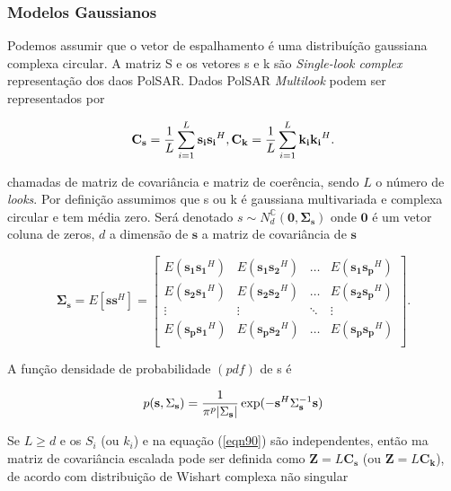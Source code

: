 \documentclass[12pt,a4paper]{article}
\begin{document}
\subsubsection{Modelos Gaussianos}


Podemos assumir que o vetor de espalhamento é uma distribuíção gaussiana complexa circular. A matriz {\boldmath S} e os vetores {\boldmath s} e {\boldmath k} são {\it Single-look complex} representação dos daos PolSAR. Dados PolSAR {\it Multilook} podem ser representados por
 
\begin{equation}\label{eqn90}
	\mathbf{C_{\mathbf s}}=\frac{1}{L}\sum_{i=1}^{L} \mathbf{s_i s_i}^H ,
	\mathbf{C_{\mathbf k}}=\frac{1}{L}\sum_{i=1}^{L} \mathbf{k_i k_i}^H . \\
\end{equation}

chamadas de matriz de covariância e matriz de coerência, sendo $L$ o número de {\it looks}. Por definição assumimos que {\boldmath s} ou {\boldmath k} é gaussiana multivariada e complexa circular e tem média zero. Será denotado $s\sim N_d^\mathbb{C}(\mathbf{0, \Sigma_{s}})$ onde $\mathbf{0}$ é um vetor coluna de zeros, $d$ a dimensão de $\mathbf{s}$ a matriz de covariância de $\mathbf{s}$  

\begin{equation}\label{eqn91}
	\mathbf{\Sigma_{\mathbf{s}}} = E[\mathbf{s}\mathbf{s}^H] =\left[
\begin{array}{cccc}
	E(\mathbf{s_1s_1}^H)  & E(\mathbf{s_1s_2}^H) &\hdots & E(\mathbf {s_1s_p}^H) \\
	E(\mathbf{s_2 s_1}^H)  & E(\mathbf{ s_2 s_2}^H) &\hdots &E(\mathbf{s_2 s_p}^H)\\
        \vdots&\vdots &\ddots &\vdots\\
	E(\mathbf{s_p s_1}^H)  & E(\mathbf{s_ps_2}^H) &\hdots &E(\mathbf{s_p s_p}^H)\\
\end{array}
\right].
\end{equation}

A função densidade de probabilidade $(pdf)$ de {\boldmath s} é 

\begin{equation}\label{eqn92}
	p(\mathbf{s},\Sigma_{\mathbf{s}})=\frac{1}{\pi^p|\Sigma_{\mathbf{s}}|}\exp(-\mathbf{s}^{H}\Sigma_{\mathbf{s}}^{-1}\mathbf{s})  \\
\end{equation}

Se $L\geq d$ e os {\boldmath$S_i$} (ou {\boldmath$k_i$}) e na equação (\ref{eqn90}) são independentes, então ma matriz de covariância escalada pode ser definida como $\mathbf{Z}=L\mathbf{C_{\mathbf s}}$ (ou $\mathbf{Z}=L\mathbf{C_k}$), de acordo com distribuição de Wishart complexa não singular \cite{goodman1963}
\end{document}
